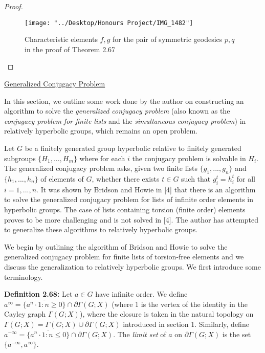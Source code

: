 \documentclass[12pt]{article}
\newcommand{\vs}{\vskip10pt}
\begin{document}
\begin{proof}
		
\begin{figure} [H]
	\centering
	\texttt{[image: "../Desktop/Honours Project/IMG\_1482"]}
	\caption{Characteristic elements $f,g$ for the pair of symmetric geodesics $p,q$ in the proof of Theorem 2.67}
	\label{fig:img1482}
\end{figure}
		
	\end{proof}
	
	\underline{Generalized Conjugacy Problem}

	\vs 
	
	In this section, we outline some work done by the author on constructing an algorithm to solve the \textit{generalized conjugacy problem} (also known as the \textit{conjugacy problem for finite lists} and the \textit{simultaneous conjugacy problem}) in relatively hyperbolic groups, which remains an open problem. 
	
	\vs 
	
	Let $G$ be a finitely generated group hyperbolic relative to finitely generated subgroups $\{H_1,...,H_m\}$ where for each $i$ the conjugacy problem is solvable in $H_i$. The generalized conjugacy problem asks, given two finite lists $\{g_1,...,g_n\}$ and $\{h_1,...,h_n\}$ of elements of $G$, whether there exists $t \in G$ such that $g_i^t = h_i^t$ for all $i = 1,...,n$. It was shown by Bridson and Howie in [4] that there is an algorithm to solve the generalized conjugacy problem for lists of infinite order elements in hyperbolic groups. The case of lists containing torsion (finite order) elements proves to be more challenging and is not solved in [4]. The author has attempted to generalize these algorithms to relatively hyperbolic groups. 
	
	\vs 
	
	We begin by outlining the algorithm of Bridson and Howie to solve the generalized conjugacy problem for finite lists of torsion-free elements and we discuss the generalization to relatively hyperbolic groups. We first introduce some terminology. 
	
	\vs 
	
	\textbf{Definition 2.68: } Let $a \in G$ have infinite order. We define $a^{\infty} = \overline{\{a^n \cdot 1: n \geq 0\}} \cap \partial \Gamma(G; X)$ (where $1$ is the vertex of the identity in the Cayley graph $\Gamma(G; X)$), where the closure is taken in the natural topology on $\overline{\Gamma(G; X)} = \Gamma(G; X) \cup \partial \Gamma(G; X)$ introduced in section 1. Similarly, define $a^{-\infty} = \overline{\{a^n \cdot 1: n \leq 0\}} \cap \partial \Gamma(G; X)$. The \textit{limit set} of $a$ on $\partial \Gamma(G; X)$ is the set $\{a^{-\infty}, a^{\infty}\}$. 
	
\end{document}

